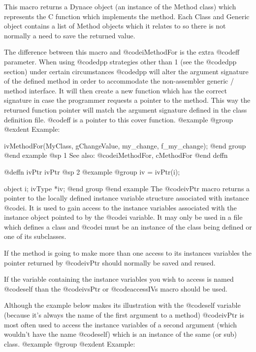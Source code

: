 {{{{This macro returns a Dynace object (an instance of the Method class) which
represents the C function which implements the method.  Each Class 
and Generic object contains a list of Method objects which it relates
to so there is not normally a need to save the returned value.

The difference between this macro and @code{iMethodFor} is the extra @code{ff}
parameter.  When using @code{dpp} strategies other than 1 (see the @code{dpp}
section) under certain circumstances @code{dpp} will alter the argument
signature of the defined method in order to accommodate the non-assembler
generic / method interface.  It will then create a new function which has
the correct signature in case the programmer requests a pointer to the
method.  This way the returned function pointer will match the argument
signature defined in the class definition file.  @code{ff} is a pointer
to this cover function.
@example
@group
@exdent Example:

ivMethodFor(MyClass, gChangeValue, my_change, f_my_change);
@end group
@end example
@sp 1
See also:  @code{iMethodFor, cMethodFor}
@end deffn
















@deffn {ivPtr} ivPtr
@sp 2
@example
@group
iv = ivPtr(i);

object  i;
ivType  *iv;
@end group
@end example
The @code{ivPtr} macro returns a pointer to the locally defined
instance variable structure associated with instance @code{i}.  It is
used to gain access to the instance variables associated with the
instance object pointed to by the @code{i} variable.  It may only be
used in a file which defines a class and @code{i} must be an instance
of the class being defined or one of its subclasses.

If the method is going to make more than one access to its instances
variables the pointer returned by @code{ivPtr} should normally be saved
and reused.

If the variable containing the instance variables you wish to access is
named @code{self} than the @code{ivsPtr} or @code{accessIVs} macro
should be used.

Although the example below makes its illustration with the @code{self}
variable (because it's always the name of the first argument to a
method) @code{ivPtr} is most often used to access the instance variables
of a second argument (which wouldn't have the name @code{self}) which is
an instance of the same (or sub) class.
@example
@group
@exdent Example:

}}}}
